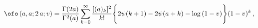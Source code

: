\begin{equation}
 \ofo \left( a, a;  
2\,a ; v\right) = {\Gamma (2a)\over \Gamma^2 (a)} 
\sum\limits_{k=0}^{\infty}  { [ (a)_k ]^2 \over  k!}
\Biggl\{ 2 \psi (k+1) - 2 \psi (a+k) - \log{(1-v)}\Biggr\} (1-v)^k \,,
\label{a_hyper_series}
\end{equation}

